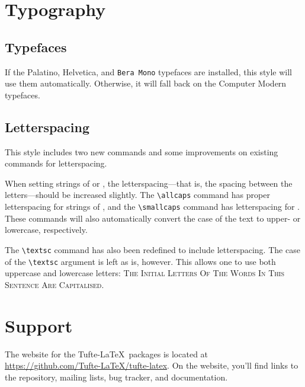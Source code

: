 \documentclass[a4paper]{tufte-handout} %
\begin{document}

\section{Typography}\label{sec:typography}

\subsection{Typefaces}\label{sec:typefaces}

If the Palatino, \textsf{Helvetica}, and \texttt{Bera Mono} typefaces are installed, this style will use them automatically. Otherwise, it will fall back on the Computer Modern typefaces.

\subsection{Letterspacing}\label{sec:letterspacing}

This style includes two new commands and some improvements on existing commands for letterspacing.

When setting strings of  or , the letter\-spacing---that is, the spacing between the letters---should be increased slightly\cite[-0.25cm]{Bringhurst2005}. The \texttt{\textbackslash allcaps} command has proper letterspacing for strings of , and the \texttt{\textbackslash smallcaps} command has letterspacing for . These commands will also automatically convert the case of the text to upper- or lowercase, respectively.

The \texttt{\textbackslash textsc} command has also been redefined to include letterspacing. The case of the \texttt{\textbackslash textsc} argument is left as is, however. This allows one to use both uppercase and lowercase letters: \textsc{The Initial Letters Of The Words In This Sentence Are Capitalised.}


\section{Support}\label{sec:support}

The website for the Tufte-\LaTeX\ packages is located at \url{https://github.com/Tufte-LaTeX/tufte-latex}. On the website, you'll find links to the  repository, mailing lists, bug tracker, and documentation.





\end{document}
